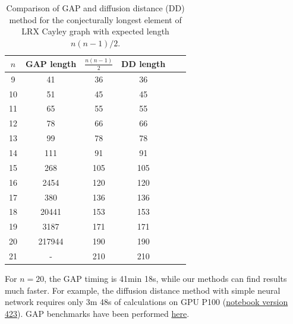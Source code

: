 \documentclass[reqno,11pt]{amsart}
\begin{document}
\begin{table}[ht]
    \centering
    \begin{tabular}{|c|c|c|c|c|c|}
        \hline
        $n$  &  GAP length   & $\frac{n(n-1)}2$            &   DD length    \\
        \hline
        9    &  41     & 36               &  36   \\
        \hline
        10   &    51   & 45               &  45       \\
        \hline
        11   &     65      & 55             &  55     \\
        \hline
        12   &    78       &  66          & 66     \\
        \hline        
        13   &    99       &  78           &   78       \\
        \hline        
        14   &   111       &  91           &   91     \\
        \hline        
        15     &   268      &  105         &  105    \\
        \hline        
        16     &    2454    &  120         &  120     \\
        \hline        
        17   &     380     &  136         & 136    \\
        \hline        
        18   &     20441   &   153        & 153    \\
        \hline        
        19   &      3187      & 171        & 171    \\
        \hline      
        20   &     217944    & 190        & 190      \\
        \hline 
        21   &   -           & 210     & 210        \\
        \hline           
    \end{tabular}
    \captionsetup{skip=10pt} 
    \caption{Comparison of GAP and diffusion distance (DD) method for the conjecturally longest element of LRX Cayley graph with expected length $n(n-1)/2$.}
    \label{tab:example}
\end{table}

For $n=20$, the  GAP timing is 41min 18s,  while our methods can find results much faster.
For example, the diffusion distance method with simple neural network requires only 3m 48s of calculations on GPU P100 (\href{https://www.kaggle.com/code/alexandervc/lrx-cayleypy-rl-mdqn?scriptVersionId=224270083}{notebook version 423}). GAP benchmarks have been performed \href{https://www.kaggle.com/code/avm888/group-elements-decomposition-gap-limits}{here}. 
\end{document}
